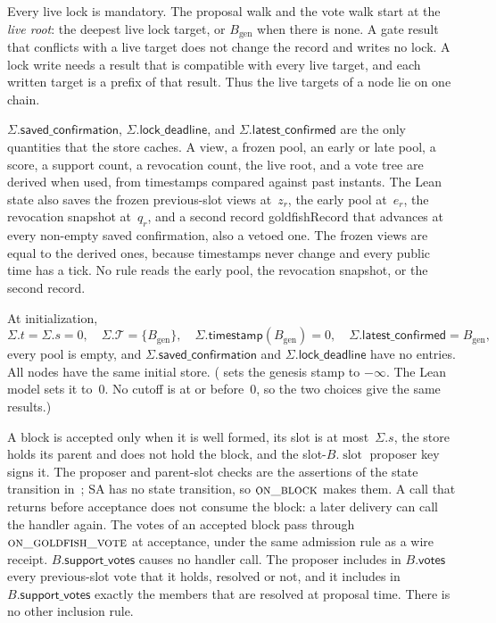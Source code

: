 \documentclass{article}
\theoremstyle{plain}
\theoremstyle{definition}
\theoremstyle{remark}
\newcommand{\genesis}{B_{\mathrm{gen}}}
\newcommand{\slot}{\operatorname{slot}}
\newcommand{\votesf}{\mathsf{votes}}
\newcommand{\supportf}{\mathsf{support\_votes}}
\newcommand{\T}{\mathcal T}
\newcommand{\latestConfirmed}{\mathsf{latest\_confirmed}}
\newcommand{\timestamp}{\mathsf{timestamp}}
\newcommand{\savedConfirmation}{\mathsf{saved\_confirmation}}
\newcommand{\lockDeadline}{\mathsf{lock\_deadline}}
\newcommand{\lean}[1]{\textsf{#1}}
\begin{document}
Every live lock is mandatory.  The proposal walk and the vote walk
start at the \emph{live root}: the deepest live lock target, or
$\genesis$ when there is none.  A gate result that conflicts with a live
target does not change the record and writes no lock.  A lock write
needs a result that is compatible with every live target, and each
written target is a prefix of that result.  Thus the live targets of a
node lie on one chain.

$\Sigma.\savedConfirmation$, $\Sigma.\lockDeadline$, and $\Sigma.\latestConfirmed$ are
the only quantities that the store caches.  A view, a frozen pool, an
early or late pool, a score, a support count, a revocation count, the live
root, and a vote tree are derived when used, from timestamps compared
against past instants.  The Lean state also saves the frozen
previous-slot views at~$z_r$, the early pool at~$e_r$, the revocation
snapshot at~$q_r$, and a second record \lean{goldfishRecord} that
advances at every non-empty saved confirmation, also a vetoed one.  The
frozen views are equal to the derived ones, because timestamps never
change and every public time has a tick.  No rule reads the early pool,
the revocation snapshot, or the second record.

At initialization,
\[
 \Sigma.t=\Sigma.s=0,\quad \Sigma.\T=\{\genesis\},\quad
 \Sigma.\timestamp(\genesis)=0,\quad
 \Sigma.\latestConfirmed=\genesis,
\]
every pool is empty, and $\Sigma.\savedConfirmation$ and $\Sigma.\lockDeadline$ have no
entries.  All nodes have the same initial store.  (\cite{DC} sets the
genesis stamp to $-\infty$.  The Lean model sets it to~$0$.  No cutoff
is at or before~$0$, so the two choices give the same results.)

A block is accepted only when it is well formed, its slot is at
most~$\Sigma.s$, the store holds its parent and does not hold the block,
and the slot-$B.\slot$ proposer key signs it.  The proposer and
parent-slot checks are the assertions of the state transition in~\cite{DC};
SA has no state transition, so $\Call{on\_block}{}$ makes them.  A call
that returns before acceptance does not consume the block: a later
delivery can call the handler again.  The votes of an accepted block
pass through $\Call{on\_goldfish\_vote}{}$ at acceptance, under the same
admission rule as a wire receipt.  $B.\supportf$ causes no handler call.
The proposer includes in $B.\votesf$ every previous-slot vote that it
holds, resolved or not, and it includes in $B.\supportf$ exactly the
members that are resolved at proposal time.  There is no other
inclusion rule.
\end{document}
